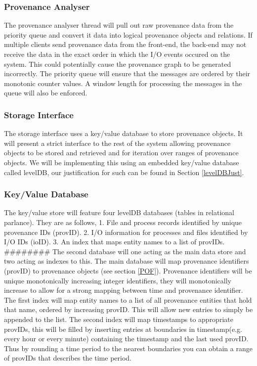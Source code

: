 \subsubsection{Provenance Analyser}
The provenance analyser thread will pull out raw provenance data from the priority queue and convert it data into logical provenance objects and relations. If multiple clients send provenance data from the front-end, the back-end may not receive the data in the exact order in which the I/O events occured on the system. This could potentially cause the provenance graph to be generated incorrectly. The priority queue will ensure that the messages are ordered by their monotonic counter values. A window length for processing the messages in the queue will also be enforced.

\subsubsection{Storage Interface}
The storage interface uses a key/value database to store provenance objects. It will present a strict interface to the rest of the system allowing provenance objects to be stored and retrieved and for iteration over ranges of provenance objects. We will be implementing this using an embedded key/value database called levelDB, our justification for such can be found in Section \ref{levelDBJust}. 

\subsubsection{Key/Value Database}
The key/value store will feature four levelDB databases (tables in relational parlance). They are as follows,
1. File and process records identified by unique provenance IDs (provID).
2. I/O information for processes and files identified by I/O IDs (ioID).
3. An index that maps entity names to a list of provIDs.
########
The second database will one acting as the main data store and two acting as indexes to this. The main database will map provenance identifiers (provID) to provenance objects (see section \ref{POF}). Provenance identifiers will be unique monotonically increasing integer identifiers, they will monotonically increase to allow for a strong mapping between time and provenance identifier. The first index will map entity names to a list of all provenance entities that hold that name, ordered by increasing provID. This will allow new entries to simply be appended to the list. The second index will map timestamps to appropriate provIDs, this will be filled by inserting entries at boundaries in timestamp(e.g. every hour or every minute) containing the timestamp and the last used provID. Thus by rounding a time period to the nearest boundaries you can obtain a range of provIDs that describes the time period.

